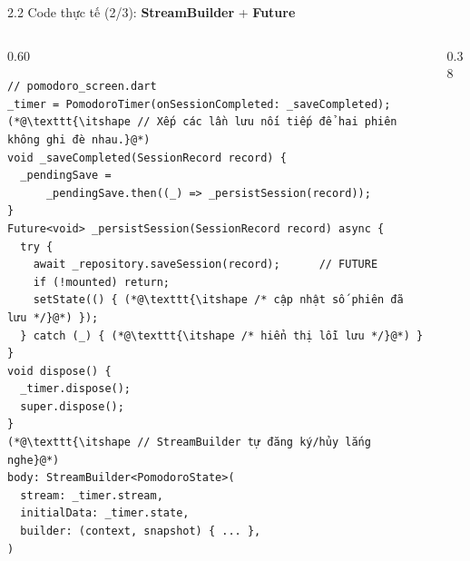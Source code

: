 \documentclass[aspectratio=169,10pt]{beamer}
\newcommand{\api}[1]{\texttt{\bfseries #1}}   %
\begin{document}
\begin{frame}[fragile]{2.2 Code thực tế (2/3): \textbf{StreamBuilder} + \textbf{Future}}
  \begin{columns}[T]
    \begin{column}{0.60\textwidth}
\begin{lstlisting}[basicstyle=\ttfamily\fontsize{6.4}{7.4}\selectfont]
// pomodoro_screen.dart
_timer = PomodoroTimer(onSessionCompleted: _saveCompleted);
(*@\texttt{\itshape // Xếp các lần lưu nối tiếp để hai phiên không ghi đè nhau.}@*)
void _saveCompleted(SessionRecord record) {
  _pendingSave =
      _pendingSave.then((_) => _persistSession(record));
}
Future<void> _persistSession(SessionRecord record) async {
  try {
    await _repository.saveSession(record);      // FUTURE
    if (!mounted) return;
    setState(() { (*@\texttt{\itshape /* cập nhật số phiên đã lưu */}@*) });
  } catch (_) { (*@\texttt{\itshape /* hiển thị lỗi lưu */}@*) }
}
void dispose() {
  _timer.dispose();
  super.dispose();
}
(*@\texttt{\itshape // StreamBuilder tự đăng ký/hủy lắng nghe}@*)
body: StreamBuilder<PomodoroState>(
  stream: _timer.stream,
  initialData: _timer.state,
  builder: (context, snapshot) { ... },
)
\end{lstlisting}
    \end{column}
    \begin{column}{0.38\textwidth}
      \footnotesize
    \end{column}
  \end{columns}
\end{frame}
\end{document}
